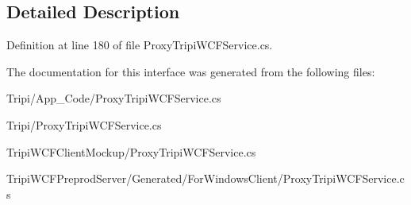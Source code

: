 \subsection{Detailed Description}


Definition at line 180 of file ProxyTripiWCFService.cs.

The documentation for this interface was generated from the following files:\begin{DoxyCompactItemize}
\item 
Tripi/App\_\-Code/ProxyTripiWCFService.cs\item 
Tripi/ProxyTripiWCFService.cs\item 
TripiWCFClientMockup/ProxyTripiWCFService.cs\item 
TripiWCFPreprodServer/Generated/ForWindowsClient/ProxyTripiWCFService.cs\end{DoxyCompactItemize}
